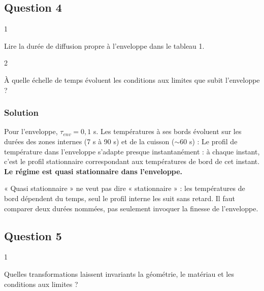 \documentclass[11pt,a4paper]{article}
\newcommand{\equationajustee}[1]{%
  \sbox{\boiteequation}{$\displaystyle #1$}%
  \ifdim\wd\boiteequation>\linewidth
    \[\resizebox{\linewidth}{!}{\usebox{\boiteequation}}\]%
  \else
    \[#1\]%
  \fi}
\begin{document}
\hypertarget{question-4}{%
\subsection{Question 4}\label{question-4}}

\begin{indication}{1}

Lire la durée de diffusion propre à l'enveloppe dans le tableau 1.

\end{indication}

\begin{indication}{2}

À quelle échelle de temps évoluent les conditions aux limites que subit l'enveloppe ?

\end{indication}

\hypertarget{solution-3}{%
\subsubsection{Solution}\label{solution-3}}

Pour l'enveloppe, \(\tau_{env}=0{,}1\) s. Les températures à ses bords évoluent sur les durées des zones internes (7 s à 90 s) et de la cuisson (\(\sim60\) s) :
\equationajustee{\frac{\tau_{env}}{t_{cuisson}}\sim\frac{0{,}1}{60}\sim2\cdot10^{-3}\ll1 .}
Le profil de température dans l'enveloppe s'adapte presque instantanément : à chaque instant, c'est le profil stationnaire correspondant aux températures de bord de cet instant. \textbf{Le régime est quasi stationnaire dans l'enveloppe.}

\begin{piege}

« Quasi stationnaire » ne veut pas dire « stationnaire » : les températures de bord dépendent du temps, seul le profil interne les suit sans retard. Il faut comparer deux durées nommées, pas seulement invoquer la finesse de l'enveloppe.

\end{piege}

\hypertarget{question-5}{%
\subsection{Question 5}\label{question-5}}

\begin{indication}{1}

Quelles transformations laissent invariants la géométrie, le matériau et les conditions aux limites ?

\end{indication}
\end{document}

